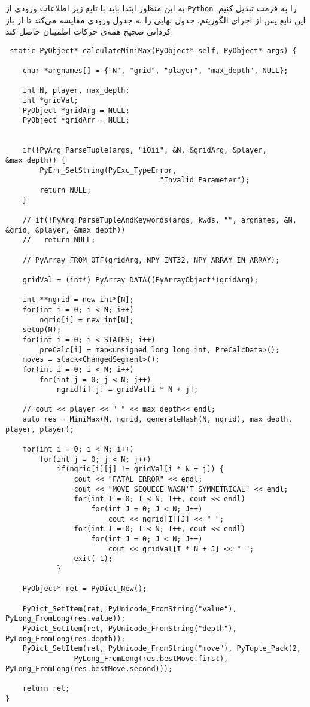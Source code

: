 به این منظور ابتدا باید با تابع زیر اطلاعات ورودی از 
\verb;Python;
را به فرمت
تبدیل کنیم.
این تابع پس از اجرای الگوریتم، جدول نهایی را به جدول ورودی مقایسه می‌کند تا از باز کردانی صحیح همه‌ی حرکات اطمینان حاصل کند.

 \begin{latin}
 \begin{lstlisting}
 static PyObject* calculateMiniMax(PyObject* self, PyObject* args) {

	char *argnames[] = {"N", "grid", "player", "max_depth", NULL};

	int N, player, max_depth;
	int *gridVal;
	PyObject *gridArg = NULL;
	PyObject *gridArr = NULL;


	if(!PyArg_ParseTuple(args, "iOii", &N, &gridArg, &player, &max_depth)) {
		PyErr_SetString(PyExc_TypeError,
									"Invalid Parameter");
		return NULL;
	}

	// if(!PyArg_ParseTupleAndKeywords(args, kwds, "", argnames, &N, &grid, &player, &max_depth))
	//   return NULL;
	
	// PyArray_FROM_OTF(gridArg, NPY_INT32, NPY_ARRAY_IN_ARRAY);

	gridVal = (int*) PyArray_DATA((PyArrayObject*)gridArg);

	int **ngrid = new int*[N];
	for(int i = 0; i < N; i++)
		ngrid[i] = new int[N];
	setup(N);
	for(int i = 0; i < STATES; i++)
		preCalc[i] = map<unsigned long long int, PreCalcData>();
	moves = stack<ChangedSegment>();
	for(int i = 0; i < N; i++)
		for(int j = 0; j < N; j++)
			ngrid[i][j] = gridVal[i * N + j];

	// cout << player << " " << max_depth<< endl;
	auto res = MiniMax(N, ngrid, generateHash(N, ngrid), max_depth, player, player);

	for(int i = 0; i < N; i++)
		for(int j = 0; j < N; j++)
			if(ngrid[i][j] != gridVal[i * N + j]) {
				cout << "FATAL ERROR" << endl;
				cout << "MOVE SEQUECE WASN'T SYMMETRICAL" << endl;
				for(int I = 0; I < N; I++, cout << endl)
					for(int J = 0; J < N; J++)
						cout << ngrid[I][J] << " ";
				for(int I = 0; I < N; I++, cout << endl)
					for(int J = 0; J < N; J++)
						cout << gridVal[I * N + J] << " ";
				exit(-1);
			}

	PyObject* ret = PyDict_New();

	PyDict_SetItem(ret, PyUnicode_FromString("value"), PyLong_FromLong(res.value));
	PyDict_SetItem(ret, PyUnicode_FromString("depth"), PyLong_FromLong(res.depth));
	PyDict_SetItem(ret, PyUnicode_FromString("move"), PyTuple_Pack(2, 
				PyLong_FromLong(res.bestMove.first), PyLong_FromLong(res.bestMove.second)));

	return ret;
}

 \end{lstlisting}
 \end{latin}
 
